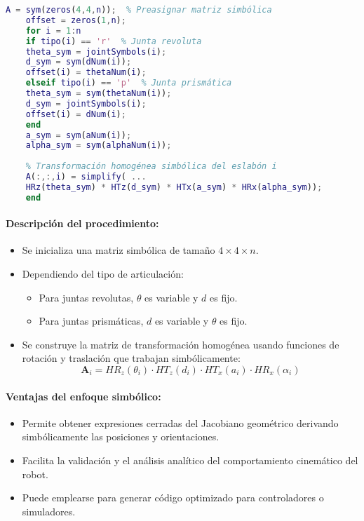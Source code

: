 \begin{lstlisting}[language=Matlab, caption={Transformaciones homogéneas simbólicas}]
	A = sym(zeros(4,4,n));  % Preasignar matriz simbólica
	offset = zeros(1,n);
	for i = 1:n
	if tipo(i) == 'r'  % Junta revoluta
	theta_sym = jointSymbols(i);
	d_sym = sym(dNum(i));
	offset(i) = thetaNum(i);
	elseif tipo(i) == 'p'  % Junta prismática
	theta_sym = sym(thetaNum(i));
	d_sym = jointSymbols(i);
	offset(i) = dNum(i);
	end
	a_sym = sym(aNum(i));
	alpha_sym = sym(alphaNum(i));
	
	% Transformación homogénea simbólica del eslabón i
	A(:,:,i) = simplify( ...
	HRz(theta_sym) * HTz(d_sym) * HTx(a_sym) * HRx(alpha_sym));
	end
\end{lstlisting}

\paragraph{Descripción del procedimiento:}
\begin{itemize}
	\item Se inicializa una matriz simbólica de tamaño \( 4 \times 4 \times n \).
	\item Dependiendo del tipo de articulación:
	\begin{itemize}
		\item Para juntas revolutas, \( \theta \) es variable y \( d \) es fijo.
		\item Para juntas prismáticas, \( d \) es variable y \( \theta \) es fijo.
	\end{itemize}
	\item Se construye la matriz de transformación homogénea usando funciones de rotación y traslación que trabajan simbólicamente:
	\[
	\mathbf{A}_i = HR_z(\theta_i) \cdot HT_z(d_i) \cdot HT_x(a_i) \cdot HR_x(\alpha_i)
	\]
\end{itemize}

\paragraph{Ventajas del enfoque simbólico:}
\begin{itemize}
	\item Permite obtener expresiones cerradas del Jacobiano geométrico derivando simbólicamente las posiciones y orientaciones.
	\item Facilita la validación y el análisis analítico del comportamiento cinemático del robot.
	\item Puede emplearse para generar código optimizado para controladores o simuladores.
\end{itemize}


